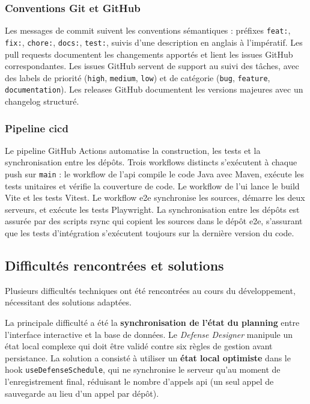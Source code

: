 \subsubsection{Conventions Git et GitHub}
\label{ch4:git_conventions}

Les messages de commit suivent les conventions sémantiques : préfixes \texttt{feat:}, \texttt{fix:}, \texttt{chore:}, \texttt{docs:}, \texttt{test:}, suivis d'une description en anglais à l'impératif. Les pull requests documentent les changements apportés et lient les issues GitHub correspondantes. Les issues GitHub servent de support au suivi des tâches, avec des labels de priorité (\texttt{high}, \texttt{medium}, \texttt{low}) et de catégorie (\texttt{bug}, \texttt{feature}, \texttt{documentation}). Les releases GitHub documentent les versions majeures avec un changelog structuré.

\subsubsection{Pipeline \acrshort{cicd}}
\label{ch4:cicd}

Le pipeline GitHub Actions automatise la construction, les tests et la synchronisation entre les dépôts. Trois workflows distincts s'exécutent à chaque push sur \texttt{main} : le workflow de l'\acrshort{api} compile le code Java avec Maven, exécute les tests unitaires et vérifie la couverture de code. Le workflow de l'\acrshort{ui} lance le build Vite et les tests Vitest. Le workflow \acrshort{e2e} synchronise les sources, démarre les deux serveurs, et exécute les tests Playwright. La synchronisation entre les dépôts est assurée par des scripts rsync qui copient les sources dans le dépôt \acrshort{e2e}, s'assurant que les tests d'intégration s'exécutent toujours sur la dernière version du code.

\subsection{Difficultés rencontrées et solutions}
\label{ch4:difficultes}

Plusieurs difficultés techniques ont été rencontrées au cours du développement, nécessitant des solutions adaptées.

La principale difficulté a été la \textbf{synchronisation de l'état du planning} entre l'interface interactive et la base de données. Le \textit{Defense Designer} manipule un état local complexe qui doit être validé contre six règles de gestion avant persistance. La solution a consisté à utiliser un \textbf{état local optimiste} dans le hook \texttt{useDefenseSchedule}, qui ne synchronise le serveur qu'au moment de l'enregistrement final, réduisant le nombre d'appels \acrshort{api} (un seul appel de sauvegarde au lieu d'un appel par dépôt).

